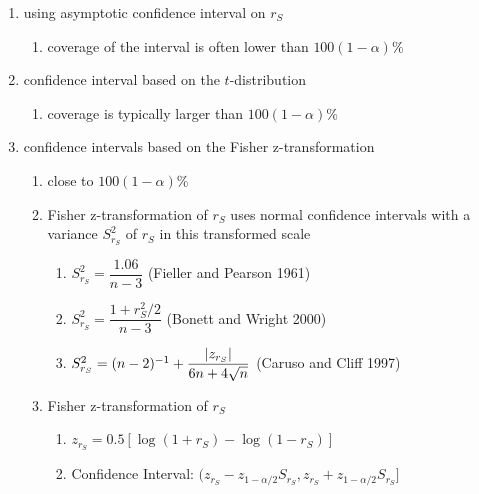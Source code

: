 \begin{enumerate}[itemsep=0.2cm]
    \item using asymptotic confidence interval on $r_S$
    \begin{enumerate}[itemsep=0.2cm]
        \item coverage of the interval is often lower than $100(1 - \alpha)\%$

    \end{enumerate}
    
    \item confidence interval based on the $t$-distribution
    \begin{enumerate}[itemsep=0.2cm]
        \item coverage is typically larger than $100(1 - \alpha)\%$
    \end{enumerate}

    \item confidence intervals based on the Fisher z-transformation
    \begin{enumerate}[itemsep=0.2cm]
        \item close to $100(1 - \alpha)\%$
        
        \item Fisher z-transformation of $r_S$ uses normal confidence intervals with a variance $S_{r_S}^2$ of $r_S$ in this transformed scale
        \begin{enumerate}[itemsep=0.2cm]
            \item $
                S_{r_S}^2 
                = \dfrac{1.06}{n-3}
            $ \hfill (Fieller and Pearson 1961)

            \item $
                S_{r_S}^2 
                = \dfrac{1 + r_S^2/2}{n-3}
            $ \hfill (Bonett and Wright 2000)

            \item $
                S_{r_S}^2 
                = (n-2)^{-1} + \dfrac{\left| z_{r_S} \right|}{6n + 4\sqrt{n}}
            $ \hfill (Caruso and Cliff 1997)

        \end{enumerate}

        \item Fisher z-transformation of $r_S$
        \begin{enumerate}[itemsep=0.2cm]
            \item $z_{r_S} = 0.5[\log(1 + r_S) - \log(1 - r_S)]$

            \item Confidence Interval:
            $(
                z_{r_S} - z_{1 - \alpha/2}S_{r_S},
                z_{r_S} + z_{1 - \alpha/2}S_{r_S}
            ]$
        \end{enumerate}


\end{enumerate}
\end{enumerate}
